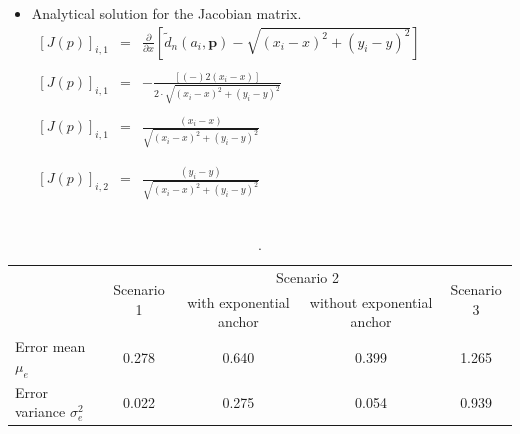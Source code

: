 \documentclass{article}
\begin{document}
\begin{itemize}

	\item Analytical solution for the Jacobian matrix.\\
	
	    $\begin{array}{ccc}
    
        \left[ J(p)\right]_{i,1} & = & \frac{\partial}{\partial x} \left[ \tilde{d}_n(a_i,\mathbf{p}) - \sqrt{(x_i - x)^2 + (y_i - y)^2} \right] \\\\
        \left[ J(p) \right]_{i,1} & = & -\frac{[(-)2(x_i-x)]}{2 \cdot\sqrt{(x_i - x)^2 + (y_i - y)^2}} \\\\
        \left[ J(p) \right]_{i,1} & = & \frac{(x_i-x)}{\sqrt{(x_i - x)^2 + (y_i - y)^2}}\\\\\\
        
        
        \left[ J(p) \right]_{i,2} & = & \frac{(y_i-y)}{\sqrt{(x_i - x)^2 + (y_i - y)^2}}\\\\\\

    \end{array}$

\end{itemize}

\begin{table}[h]
\centering
\begin{tabular}{l||c||c|c||c|}
\cline{2-5}
                                                       & \multirow{2}{*}{Scenario 1} & \multicolumn{2}{c||}{Scenario 2}                      & \multirow{2}{*}{Scenario 3} \\ \cline{3-4}
                                                       &                             & with exponential anchor & without exponential anchor &                             \\ \hline\hline
\multicolumn{1}{|l||}{Error mean $\mu_{e}$}          & 0.278                      & 0.640                  & 0.399                     & 1.265                      \\ \hline
\multicolumn{1}{|l||}{Error variance $\sigma^2_{e}$} & 0.022                      & 0.275                  & 0.054                     & 0.939                      \\ \hline
\end{tabular}
\caption{.}
\label{tab:ls_mean_var}
\end{table}
\end{document}
